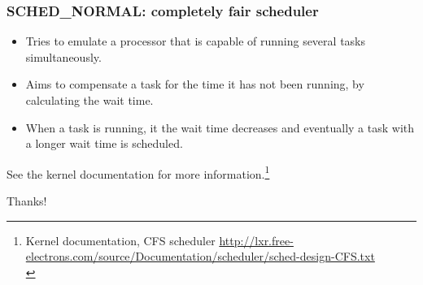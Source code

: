 \documentclass{beamer}
\begin{document}
\begin{frame}
\frametitle{SCHED_NORMAL: completely fair scheduler}
\begin{itemize}
	\item Tries to emulate a processor that is capable of running several tasks simultaneously.
	\item Aims to compensate a task for the time it has not been running, by calculating the wait time. 
	\item When a task is running, it the wait time decreases and eventually a task with a longer wait time is scheduled.
\end{itemize}
See the kernel documentation for more information.\footnote{Kernel documentation, CFS scheduler \url{http://lxr.free-electrons.com/source/Documentation/scheduler/sched-design-CFS.txt} \\}


\end{frame}

\begin{frame}
\Huge{\centerline{Thanks!}}
\end{frame}
\end{document}
